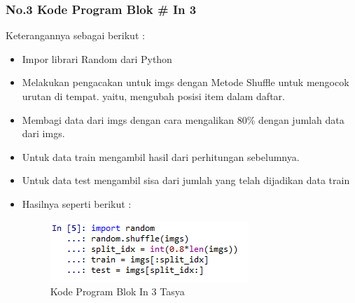 \subsubsection{No.3 Kode Program Blok \# In 3}

Keterangannya sebagai berikut :\\
\begin{itemize}
\item Impor librari Random dari Python
\item Melakukan pengacakan untuk imgs dengan Metode Shuffle  untuk mengocok urutan di tempat. yaitu, mengubah posisi item dalam daftar.
\item Membagi data dari imgs dengan cara mengalikan 80\% dengan jumlah data dari imgs.
\item Untuk data train mengambil hasil dari perhitungan sebelumnya.
\item Untuk data test mengambil sisa dari jumlah yang telah dijadikan data train
\item Hasilnya seperti berikut :
\begin{figure}[ht]
\centering
\includegraphics[scale=0.5]{figures/Chapter 7/1164086/Praktek/chapter7tasya16.png}
\caption{Kode Program Blok In 3 Tasya}
\label{Praktek}
\end{figure}
\end{itemize}

